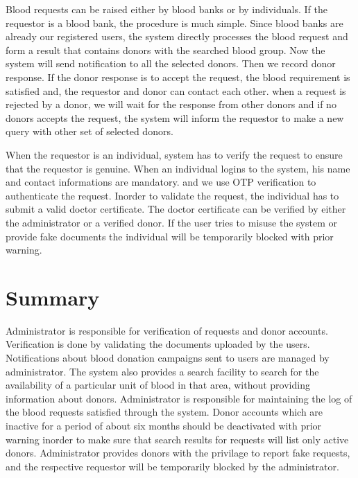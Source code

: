 Blood requests can be raised either by blood banks or by individuals. If the requestor is a blood bank, the procedure is much simple. Since blood banks are already our registered users, the system directly processes the blood request and form a result that contains donors with the searched blood group. Now the system will send notification to all the selected donors. Then we record donor response. If the donor response is to accept the request, the blood requirement is satisfied and, the requestor and donor can contact each other. when a request is rejected by a donor, we will wait for the response from other donors and if no donors accepts the request, the system will inform the requestor to make a new query with other set of selected donors.

\noindent When the requestor is an individual, system has to verify the request to ensure that the requestor is genuine. When an individual logins to the system, his name and contact informations are mandatory. and we use OTP verification to authenticate the request. Inorder to validate the request, the individual has to submit a valid doctor certificate. The doctor certificate can be verified by either the administrator or a verified donor. If the user tries to misuse the system or provide fake documents the individual will be temporarily blocked with prior warning.




\section{Summary}


Administrator is responsible for verification of requests and donor accounts. Verification is done by validating the documents uploaded by the users. Notifications about blood donation campaigns sent to users are managed by administrator. The system also provides a search facility to search for the availability of a particular unit of blood in that area, without providing information about donors. Administrator is responsible for maintaining the log of the blood requests satisfied through the system. Donor accounts which are inactive for a period of about six months should be deactivated with prior warning inorder to make sure that search results for requests will list only active donors. Administrator provides donors with the privilage to report fake requests, and the respective requestor will be temporarily blocked by the administrator.
